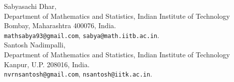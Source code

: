\documentclass[10pt, reqno]{amsart}
\theoremstyle{plain}
\numberwithin{equation}{section}
\begin{document}
 

\vspace{0.2 cm}
Sabyasachi Dhar, \\
Department of Mathematics and Statistics, Indian
Institute of Technology Bombay, Maharashtra 400076, India.\\
\texttt{mathsabya93@gmail.com},
\texttt{sabya@math.iitb.ac.in}.
\vspace{0.1 cm}\\
Santosh Nadimpalli,\\
Department of Mathematics and Statistics, Indian
Institute of Technology Kanpur, U.P. 208016, India.\\
\texttt{nvrnsantosh@gmail.com}, \texttt{nsantosh@iitk.ac.in}.
\end{document}
